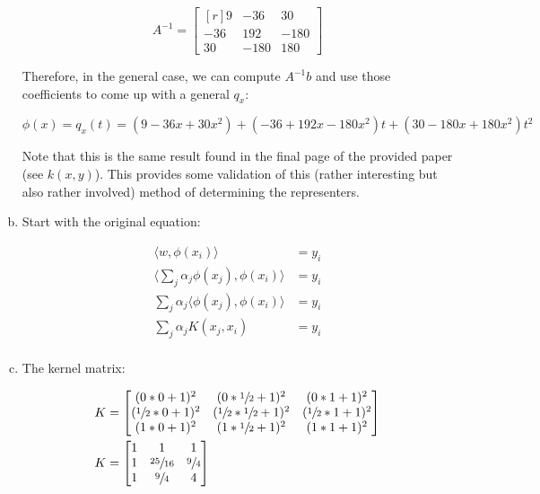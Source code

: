 \documentclass[fleqn]{homework}
\newcommand{\inner}[1]{\langle #1 \rangle}
\begin{document}
\begin{problem}{4}
\begin{enumerate}[(a)]
      \begin{equation*}
        A^{-1} = \begin{bmatrix*}[r] 9 & -36 & 30 \\ -36 & 192 & -180 \\ 30 &-180 & 180 \end{bmatrix*}
      \end{equation*}

      Therefore, in the general case, we can compute $A^{-1}b$ and use those
      coefficients to come up with a general $q_x$:

      \begin{equation*}
        \phi(x) = q_x(t) = (9 - 36x + 30x^2) + (-36 + 192x - 180x^2)t + (30 -
        180x + 180x^2)t^2
      \end{equation*}

      Note that this is the same result found in the final page of the provided
      paper (see $k(x,y)$).  This provides some validation of this (rather
      interesting but also rather involved) method of determining the
      representers.

    \item Start with the original equation:

      \begin{align*}
        \inner{w, \phi(x_i)} &= y_i \\
        \inner{\sum_{j} \alpha_j \phi(x_j), \phi(x_i)} &= y_i \\
        \sum_j \alpha_j \inner{\phi(x_j), \phi(x_i)} &= y_i \\
        \sum_j \alpha_j K(x_j, x_i) &= y_i \\
      \end{align*}

    \item The kernel matrix:

      \begin{align*}
        K &=
        \begin{bmatrix*}
          (0 * 0 + 1)^2 & (0 * \sfrac{1}{2} + 1)^2 & (0 * 1 + 1)^2 \\
          (\sfrac{1}{2} * 0 + 1)^2 & (\sfrac{1}{2} * \sfrac{1}{2} + 1)^2 & (\sfrac{1}{2} * 1 + 1)^2 \\
          (1 * 0 + 1)^2 & (1 * \sfrac{1}{2} + 1)^2 & (1*1 + 1)^2 \\
        \end{bmatrix*} \\
        K &=
        \begin{bmatrix*}
          1 & 1 & 1 \\
          1 & \sfrac{25}{16} & \sfrac{9}{4} \\
          1 & \sfrac{9}{4} & 4 \\
        \end{bmatrix*} \\
      \end{align*}


\end{enumerate}
\end{problem}
\end{document}

